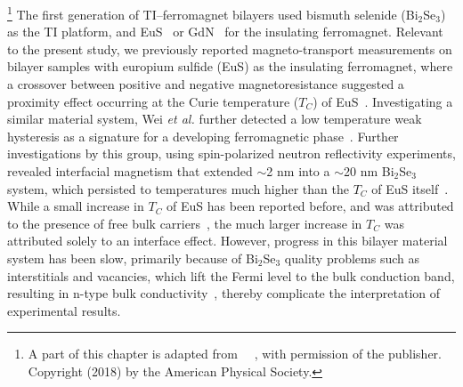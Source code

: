 \footnote[2]{A part of this chapter is adapted from ~\cite{bilayer2018}~, with permission of the publisher. Copyright (2018) by the American Physical Society.}%
%
The first generation of TI--ferromagnet bilayers used bismuth selenide (Bi$_2$Se$_3$) as the TI platform, and EuS~\cite{bilayer2014,Moodera2013} or GdN~\cite{Samarth2013} for the insulating ferromagnet. Relevant to the present study, we previously reported magneto-transport measurements on bilayer samples with europium sulfide (EuS) as the insulating ferromagnet, where a crossover between positive and negative magnetoresistance suggested a proximity effect occurring at the Curie temperature ($T_C$) of EuS~\cite{bilayer2014}. Investigating a similar material system, Wei {\it et al.} further detected a low temperature weak hysteresis as a signature for a developing ferromagnetic phase~\cite{Moodera2013}. Further investigations by this group, using spin-polarized neutron reflectivity experiments, revealed interfacial magnetism that extended $\sim$2 nm into a $\sim$20 nm Bi$_2$Se$_3$ system, which persisted to temperatures much higher than the $T_C$ of EuS itself~\cite{Moodera2016}. While a small increase in $T_C$ of EuS has been reported before, and was attributed to the presence of free bulk carriers~\cite{EuS_ntype, EuS_thin_film_Keller}, the much larger increase in $T_C$ was attributed solely to an interface effect. However, progress in this bilayer material system has been slow, primarily because of Bi$_2$Se$_3$ quality problems such as interstitials and vacancies, which lift the Fermi level to the bulk conduction band, resulting in n-type bulk conductivity~\cite{TI_ARPES1, zhangli2013, Zhanybek3, Fisher2010}, thereby complicate the interpretation of experimental results. 